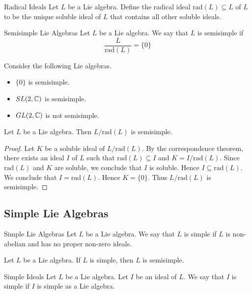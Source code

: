 \documentclass[a4paper]{article}
\begin{document}
\begin{defn}{Radical Ideals}{} Let $L$ be a Lie algebra. Define the radical ideal $\text{rad}(L)\subseteq L$ of $L$ to be the unique soluble ideal of $L$ that contains all other soluble ideals. 
\end{defn}

\begin{defn}{Semisimple Lie Algebras}{}{} Let $L$ be a Lie algebra. We say that $L$ is semisimple if $$\frac{L}{\text{rad}(L)}=\{0\}$$
\end{defn}

\begin{eg}{}{} Consider the following Lie algebras. 
\begin{itemize}
\item $\{0\}$ is semisimple. 
\item $SL(2,\mathbb{C})$ is semisimple. 
\item $GL(2,\mathbb{C})$ is not semisimple. 
\end{itemize}
\end{eg}

\begin{lmm}{}{} Let $L$ be a Lie algebra. Then $L/\text{rad}(L)$ is semisimple. \tcbline
\begin{proof}
Let $K$ be a soluble ideal of $L/\text{rad}(L)$. By the correspondence theorem, there exists an ideal $I$ of $L$ such that $\text{rad}(L)\subseteq I$ and $K=I/\text{rad}(L)$. Since $\text{rad}(L)$ and $K$ are soluble, we conclude that $I$ is soluble. Hence $I\subseteq\text{rad}(L)$. We conclude that $I=\text{rad}(L)$. Hence $K=\{0\}$. Thus $L/\text{rad}(L)$ is semisimple. 
\end{proof}
\end{lmm}

\subsection{Simple Lie Algebras}
\begin{defn}{Simple Lie Algebras}{} Let $L$ be a Lie algebra. We say that $L$ is simple if $L$ is non-abelian and has no proper non-zero ideals. 
\end{defn}

\begin{lmm}{}{} Let $L$ be a Lie algebra. If $L$ is simple, then $L$ is semisimple. 
\end{lmm}

\begin{defn}{Simple Ideals}{} Let $L$ be a Lie algebra. Let $I$ be an ideal of $L$. We say that $I$ is simple if $I$ is simple as a Lie algebra. 
\end{defn}
\end{document}
